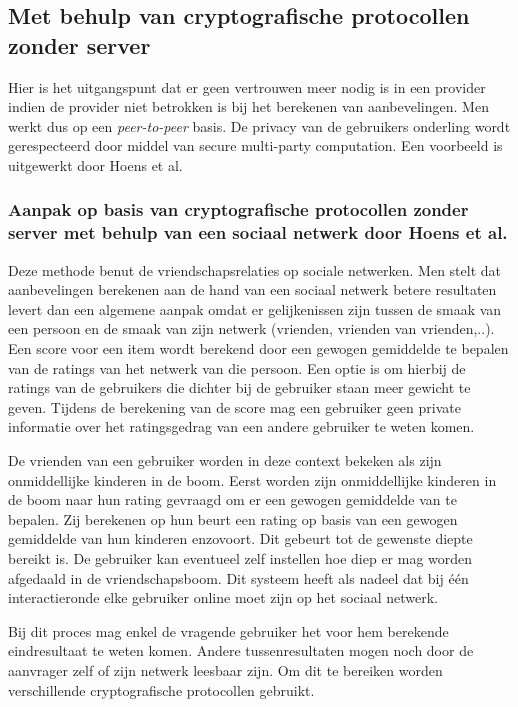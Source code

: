 \subsection{Met behulp van cryptografische protocollen zonder server}

Hier is het uitgangspunt dat er geen vertrouwen meer nodig is in een provider indien de provider niet betrokken is bij het berekenen van aanbevelingen. Men werkt dus op een \textit{peer-to-peer} basis. De privacy van de gebruikers onderling wordt gerespecteerd door middel van secure multi-party computation. Een voorbeeld is uitgewerkt door Hoens et al. 


\subsubsection{Aanpak op basis van cryptografische protocollen zonder server met behulp van een sociaal netwerk door Hoens et al. \cite{hoens2010private}}


Deze methode benut de vriendschapsrelaties op sociale netwerken. Men stelt dat aanbevelingen berekenen aan de hand van een sociaal netwerk betere resultaten levert dan een algemene aanpak omdat er gelijkenissen zijn tussen de smaak van een persoon en de smaak van zijn netwerk (vrienden, vrienden van vrienden,..). Een score voor een item wordt berekend door een gewogen gemiddelde te bepalen van de ratings van het netwerk van die persoon. Een optie is om hierbij de ratings van de gebruikers die dichter bij de gebruiker staan meer gewicht te geven. 
Tijdens de berekening van de score mag een gebruiker geen private informatie over het ratingsgedrag van een andere gebruiker te weten komen.

De vrienden van een gebruiker worden in deze context bekeken als zijn onmiddellijke kinderen in de boom. Eerst worden zijn onmiddellijke kinderen in de boom naar hun rating gevraagd om er een gewogen gemiddelde van te bepalen. Zij berekenen op hun beurt een rating op basis van een gewogen gemiddelde van hun kinderen enzovoort. Dit gebeurt tot de gewenste diepte bereikt is. De gebruiker kan eventueel zelf instellen hoe diep er mag worden afgedaald in de vriendschapsboom. Dit systeem heeft als nadeel dat bij \'e\'en interactieronde elke gebruiker online moet zijn op het sociaal netwerk.

Bij dit proces mag enkel de vragende gebruiker het voor hem berekende eindresultaat te weten komen. Andere tussenresultaten mogen noch door de aanvrager zelf of zijn netwerk leesbaar zijn. Om dit te bereiken worden verschillende cryptografische protocollen gebruikt. 


